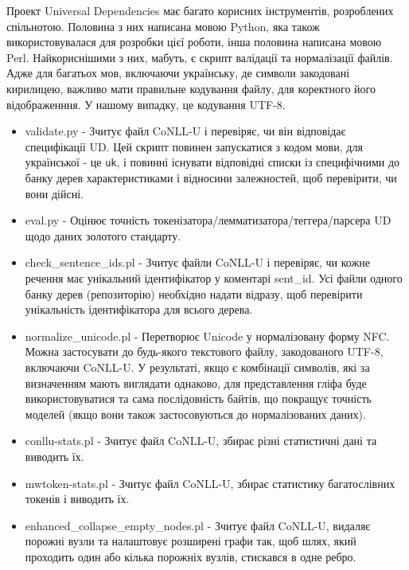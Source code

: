 Проект Universal Dependencies має багато корисних інструментів, розроблених спільнотою.
Половина з них написана мовою Python, яка також використовувалася для розробки цієї роботи, інша половина написана мовою Perl.
Найкориснішими з них, мабуть, є скрипт валідації та нормалізації
файлів. Адже для багатьох мов, включаючи українську, де символи закодовані
кирилицею, важливо мати правильне кодування файлу, для коректного його
відображенння. У нашому випадку, це кодування UTF-8.

\begin{itemize}
  \item validate.py - Зчитує файл CoNLL-U і перевіряє, чи він відповідає
  специфікації UD. Цей скрипт повинен запускатися з кодом мови, для 
  української - це \texttt{uk}, і повинні існувати відповідні списки із
  специфічними до банку дерев характеристиками і відносини залежностей, щоб 
  перевірити, чи вони дійсні.
  
  \item eval.py - Оцінює точність токенізатора/лемматизатора/теггера/парсера
  UD щодо даних золотого стандарту.
  
  \item check\_sentence\_ids.pl - Зчитує файли CoNLL-U і перевіряє, чи кожне
  речення має унікальний ідентифікатор у коментарі sent\_id.
  Усі файли одного банку дерев (репозиторію) необхідно надати відразу, щоб
  перевірити унікальність ідентифікатора для всього дерева.
  
  \item normalize\_unicode.pl - Перетворює Unicode у нормалізовану форму NFC.
  Можна застосувати до будь-якого текстового файлу, закодованого UTF-8,
  включаючи CoNLL-U. У результаті, якщо є комбінації символів, які за
  визначенням мають виглядати однаково, для представлення гліфа буде
  використовуватися та сама послідовність байтів, що покращує точність моделей
  (якщо вони також застосовуються до нормалізованих даних).
  
  \item conllu-stats.pl - Зчитує файл CoNLL-U, збирає різні статистичні дані
  та виводить їх.
  
  \item mwtoken-stats.pl - Зчитує файл CoNLL-U, збирає статистику багатослівних токенів і виводить їх.
  
  \item enhanced\_collapse\_empty\_nodes.pl - Зчитує файл CoNLL-U, видаляє
  порожні вузли та налаштовує розширені графи так, щоб шлях, який проходить
  один або кілька порожніх вузлів, стискався в одне ребро.
  

\end{itemize}
